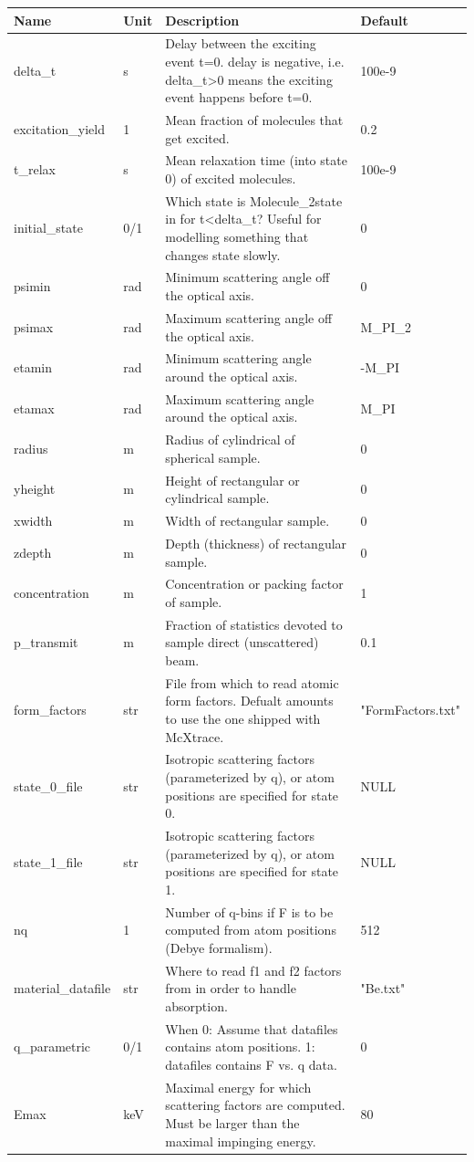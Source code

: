 \begin{longtable}{p{}p{}p{}p{}}
\toprule
\textbf{Name} & \textbf{Unit} & \textbf{Description} & \textbf{Default} \\
\midrule
\endhead
delta\_t & s & Delay between the exciting event t=0. delay is negative, i.e. delta\_t\textgreater{}0 means the exciting event happens before t=0. & 100e-9 \\
excitation\_yield & 1 & Mean fraction of molecules that get excited. & 0.2 \\
t\_relax & s & Mean relaxation time (into state 0) of excited molecules. & 100e-9 \\
initial\_state & 0/1 & Which state is Molecule\_2state in for t\textless{}delta\_t? Useful for modelling something that changes state slowly. & 0 \\
psimin & rad & Minimum scattering angle off the optical axis. & 0 \\
psimax & rad & Maximum scattering angle off the optical axis. & M\_PI\_2 \\
etamin & rad & Minimum scattering angle around the optical axis. & -M\_PI \\
etamax & rad & Maximum scattering angle around the optical axis. & M\_PI \\
radius & m & Radius of cylindrical of spherical sample. & 0 \\
yheight & m & Height of rectangular or cylindrical sample. & 0 \\
xwidth & m & Width of rectangular sample. & 0 \\
zdepth & m & Depth (thickness) of rectangular sample. & 0 \\
concentration & m & Concentration or packing factor of sample. & 1 \\
p\_transmit & m & Fraction of statistics devoted to sample direct (unscattered) beam. & 0.1 \\
form\_factors & str & File from which to read atomic form factors. Defualt amounts to use the one shipped with McXtrace. & "FormFactors.txt" \\
state\_0\_file & str & Isotropic scattering factors (parameterized by q), or atom positions are specified for state 0. & NULL \\
state\_1\_file & str & Isotropic scattering factors (parameterized by q), or atom positions are specified for state 1. & NULL \\
nq & 1 & Number of q-bins if F is to be computed from atom positions (Debye formalism). & 512 \\
material\_datafile & str & Where to read f1 and f2 factors from in order to handle absorption. & "Be.txt" \\
q\_parametric & 0/1 & When 0: Assume that datafiles contains atom positions. 1: datafiles contains F vs. q data. & 0 \\
Emax & keV & Maximal energy for which scattering factors are computed. Must be larger than the maximal impinging energy. & 80 \\
\bottomrule
\end{longtable}

